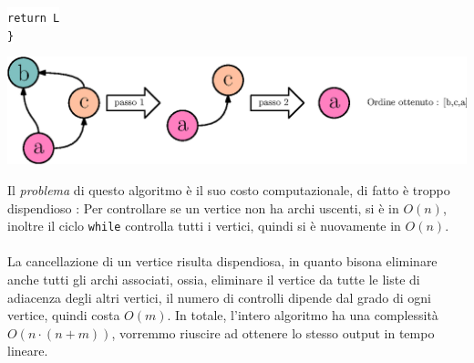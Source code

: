 \documentclass[12pt, letterpaper]{article}
\newcommand{\code}[1]{\colorbox{light-gray}{\texttt{#1}}}
\newcommand{\codee}[1]{\colorbox{white}{\texttt{#1}}}
\newcommand{\acc}{\\\hphantom{}\\}
\begin{document}
\hphantom{ident}\codee{return L}\\
\codee{\}}\begin{center}
    \includegraphics[width=1\textwidth ]{images/ordTopologico.eps}
\end{center}
Il \textit{problema} di questo algoritmo è il suo costo computazionale, di fatto è troppo dispendioso : Per
controllare se un vertice non ha archi uscenti, si è in \(O(n)\), inoltre il ciclo \code{while} controlla
tutti i vertici, quindi si è nuovamente in \(O(n)\).    \acc  La cancellazione di un vertice risulta dispendiosa, in
quanto bisona eliminare anche tutti gli archi associati, ossia, eliminare il vertice da tutte le liste
di adiacenza degli altri vertici, il numero di controlli dipende dal grado di ogni vertice,
quindi costa \(O(m)\). In totale, l'intero algoritmo ha una complessità \(O(n\cdot(n+m))\), vorremmo riuscire
ad ottenere lo stesso output in tempo lineare.
\end{document}
